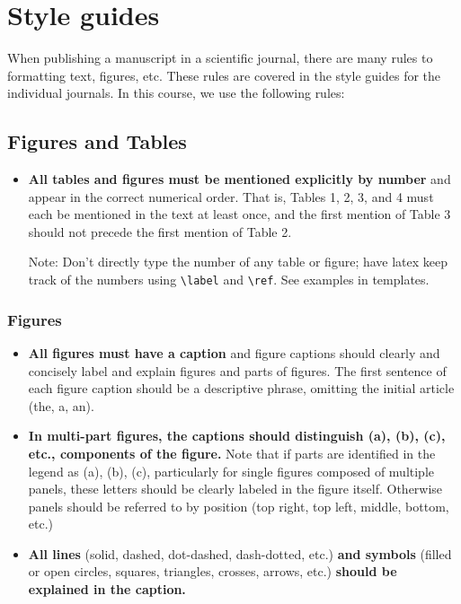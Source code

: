 \documentclass[12pt]{article}
\begin{document}
\newpage

\section{Style guides}
\label{sec:style}

When publishing a manuscript in a scientific journal, there are many
rules to formatting text, figures, etc. These rules are covered in the
style guides for the individual journals. In this course, we use the
following rules:


\subsection{Figures and Tables}
\begin{itemize}
\item {{\bf All tables and figures must be mentioned explicitly by
      number} and appear in the correct numerical order.  That is,
    Tables 1, 2, 3, and 4 must each be mentioned in the text at least
    once, and the first mention of Table 3 should not precede the
    first mention of Table 2. \par}

  {\footnotesize \sf Note: Don't directly type the number of any table or
    figure; have latex keep track of the numbers using \verb+\label+
    and \verb+\ref+.  See examples in templates.\par}
\end{itemize}

\subsubsection{Figures}

\begin{itemize}
\item {\bf All figures must have a caption} and figure captions should
  clearly and concisely label and explain figures and parts of
  figures. The first sentence of each figure caption should be a
  descriptive phrase, omitting the initial article (the, a, an).

\item {\bf In multi-part figures, the captions should distinguish (a),
    (b), (c), etc., components of the figure.} Note that if parts are
  identified in the legend as (a), (b), (c), particularly for single
  figures composed of multiple panels, these letters should be clearly
  labeled in the figure itself. Otherwise panels should be referred to
  by position (top right, top left, middle, bottom, etc.)

\item {\bf All lines} (solid, dashed, dot-dashed, dash-dotted, etc.)
  {\bf and symbols} (filled or open circles, squares, triangles,
  crosses, arrows, etc.) {\bf should be explained in the caption.}

\end{itemize}
\end{document}
